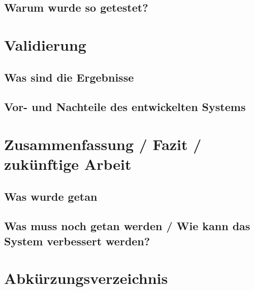 \documentclass[a4paper,12pt]{article}
\newcounter{savepage}
\begin{document}
\subsection{Warum wurde so getestet?}

\section{Validierung}

\subsection{Was sind die Ergebnisse}

\subsection{Vor- und Nachteile des entwickelten Systems}

\section{Zusammenfassung / Fazit / zukünftige Arbeit}

\subsection{Was wurde getan}

\subsection{Was muss noch getan werden / Wie kann das System verbessert werden?}

\newpage
\cleardoublepage
{}
\setcounter{page}{\thesavepage}
\clearpage
{}
{}
\printbibliography
\newpage
\renewcommand{\indexname}{Stichwortverzeichnis}
\printindex
{}
\newpage
\section*{Abkürzungsverzeichnis}
\begin{acronym}[Bash] %
\end{acronym}
\newpage
{}
{}
\listoffigures
\newpage
{}
{}
\listoftables
\newpage
\end{document}

